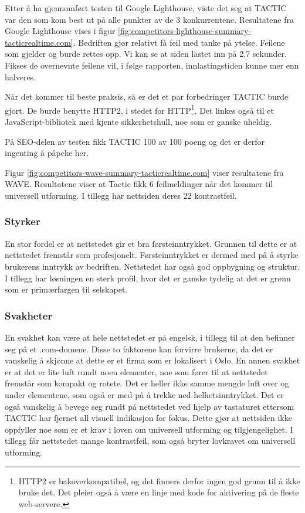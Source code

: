 Etter å ha gjennomført testen til Google Lighthouse, viste det seg at TACTIC var den som kom best ut på alle punkter av de 3 konkurrentene. Resultatene fra Google Lighthouse vises i figur \ref{fig:competitors-lighthouse-summary-tacticrealtime.com}. Bedriften gjør relativt få feil med tanke på ytelse. Feilene som gjelder  og  burde rettes opp. Vi kan se at siden lastet inn på 2,7 sekunder. Fikses de overnevnte feilene vil, i følge rapporten, innlastingstiden kunne mer enn halveres.

Når det kommer til beste praksis, så er det et par forbedringer TACTIC burde gjort. De burde benytte HTTP2, i stedet for HTTP\footnote{HTTP2 er bakoverkompatibel, og det finners derfor ingen god grunn til å ikke bruke det. Det pleier også å være en linje med kode for aktivering på de fleste web-servere.}. Det linkes også til et JavaScript-bibliotek med kjente sikkerhetshull, noe som er ganske uheldig.

På SEO-delen av testen fikk TACTIC 100 av 100 poeng og det er derfor ingenting å påpeke her.

Figur \ref{fig:competitors-wave-summary-tacticrealtime.com} viser resultatene fra WAVE. Resultatene viser at Tactic fikk 6 feilmeldinger når det kommer til universell utforming. I tillegg har nettsiden deres 22 kontrastfeil. 

\subsubsection{Styrker}
En stor fordel er at nettstedet gir et bra førsteinntrykket. Grunnen til dette er at nettstedet fremstår som profesjonelt. Førsteinntrykket er dermed med på å styrke brukerens inntrykk av bedriften. Nettstedet har også god oppbygning og struktur. I tillegg har løsningen en sterk profil, hvor det er ganske tydelig at det er grønn som er primærfargen til selskapet.

\subsubsection{Svakheter}
En svakhet kan være at hele nettstedet er på engelsk, i tillegg til at den befinner seg på et .com-domene. Disse to faktorene kan forvirre brukerne, da det er vanskelig å skjønne at dette er et firma som er lokalisert i Oslo. En annen svakhet er at det er lite luft rundt noen elementer, noe som fører til at nettstedet fremstår som kompakt og rotete. Det er heller ikke samme mengde luft over og under elementene, som også er med på å trekke ned helhetsinntrykket. Det er også vanskelig å bevege seg rundt på nettstedet ved hjelp av tastaturet ettersom TACTIC har fjernet all visuell indikasjon for fokus. Dette gjør at nettsiden ikke oppfyller noe som er et krav i loven om universell utforming og tilgjengelighet. I tillegg får nettstedet mange kontrastfeil, som også bryter lovkravet om universell utforming.


